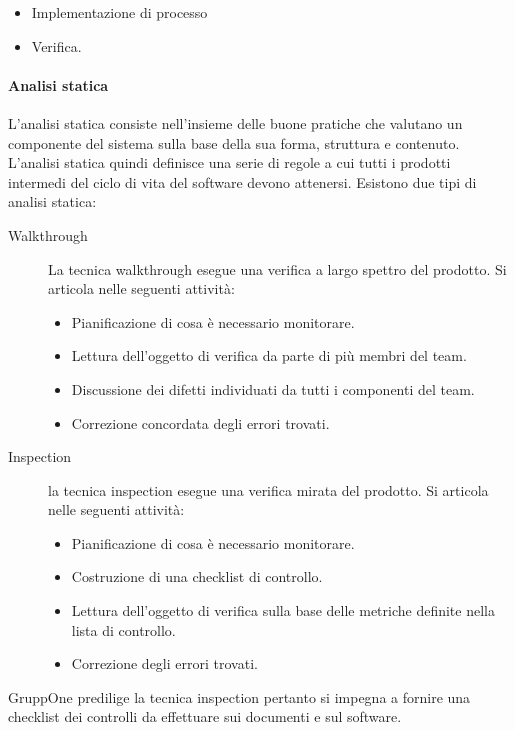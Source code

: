 \documentclass[../norme-di-progetto.tex]{subfiles}
\begin{document}
\begin{itemize}
  \item Implementazione di processo
  \item Verifica.
\end{itemize}

\paragraph{Analisi statica}%
\label{par:analisi_statica}
L'analisi statica consiste nell'insieme delle buone pratiche che valutano un componente del sistema sulla base della sua forma, struttura e contenuto.
L'analisi statica quindi definisce una serie di regole a cui tutti i prodotti intermedi del ciclo di vita del software devono attenersi. Esistono due tipi di analisi statica:
\begin{description}
  \item [Walkthrough] La tecnica walkthrough esegue una verifica a largo spettro del prodotto. Si articola nelle seguenti attività:
        \begin{itemize}
          \item Pianificazione di cosa è necessario monitorare.
          \item Lettura dell'oggetto di verifica da parte di più membri del team.
          \item Discussione dei difetti individuati da tutti i componenti del team.
          \item Correzione concordata degli errori trovati.
        \end{itemize}
  \item [Inspection] la tecnica inspection esegue una verifica mirata del prodotto. Si articola nelle seguenti attività:
        \begin{itemize}
          \item Pianificazione di cosa è necessario monitorare.
          \item Costruzione di una checklist di controllo.
          \item Lettura dell'oggetto di verifica sulla base delle metriche definite nella lista di controllo.
          \item Correzione degli errori trovati.
        \end{itemize}
\end{description}
GruppOne predilige la tecnica inspection pertanto si impegna a fornire una checklist dei controlli da effettuare sui documenti e sul software.
\end{document}
